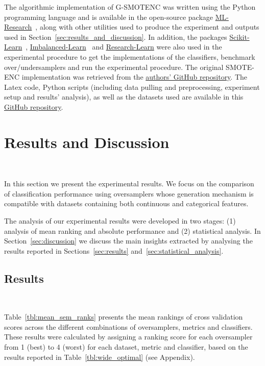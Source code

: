 \documentclass[parskip=full]{scrartcl}
\begin{document}
The algorithmic implementation of G-SMOTENC was written using the Python
programming language and is available in the open-source package
\href{https://github.com/joaopfonseca/ml-research}{ML-Research}~\cite{fonseca2021increasing},
along with other utilities used to produce the experiment and outputs used in
Section~\ref{sec:results_and_discussion}. In addition, the packages
\href{https://github.com/scikit-learn/scikit-learn/}{Scikit-Learn}~\cite{scikit-learn},
\href{https://github.com/scikit-learn-contrib/imbalanced-learn}{Imbalanced-Learn}~\cite{JMLR:v18:16-365}
and \href{https://github.com/georgedouzas/research-learn/}{Research-Learn}
were also used in the experimental procedure to get the implementations of the
classifiers, benchmark over/undersamplers and run the experimental procedure.
The original SMOTE-ENC implementation was retrieved from the
\href{https://github.com/Mimimkh/SMOTE-ENC-code}{authors' GitHub repository}.
The Latex code, Python scripts (including data pulling and preprocessing,
experiment setup and results' analysis), as well as the datasets used are
available in this \href{https://github.com/joaopfonseca/publications}{GitHub
repository}.
 

\section{Results and Discussion}~\label{sec:results_and_discussion}

In this section we present the experimental results. We focus on the
comparison of classification performance using oversamplers whose generation
mechanism is compatible with datasets containing both continuous and
categorical features.

The analysis of our experimental results were developed in two stages: (1)
analysis of mean ranking and absolute performance and (2) statistical
analysis. In Section~\ref{sec:discussion} we discuss the main insights
extracted by analysing the results reported in Sections~\ref{sec:results}
and~\ref{sec:statistical_analysis}.

\subsection{Results}~\label{sec:results}

Table~\ref{tbl:mean_sem_ranks} presents the mean rankings of cross validation
scores across the different combinations of oversamplers, metrics and
classifiers. These results were calculated by assigning a ranking score for
each oversampler from 1 (best) to 4 (worst) for each dataset, metric and
classifier, based on the results reported in Table~\ref{tbl:wide_optimal} (see
Appendix).
\end{document}
